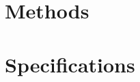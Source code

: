 \documentclass[11pt,twoside,openright]{book}
\begin{document}
\frontmatter
\maketitle
\tableofcontents


\mainmatter
\setcounter{chapter}{22}
\part{Methods}







\part{Specifications}




\appendix
{}


\backmatter
\end{document}
